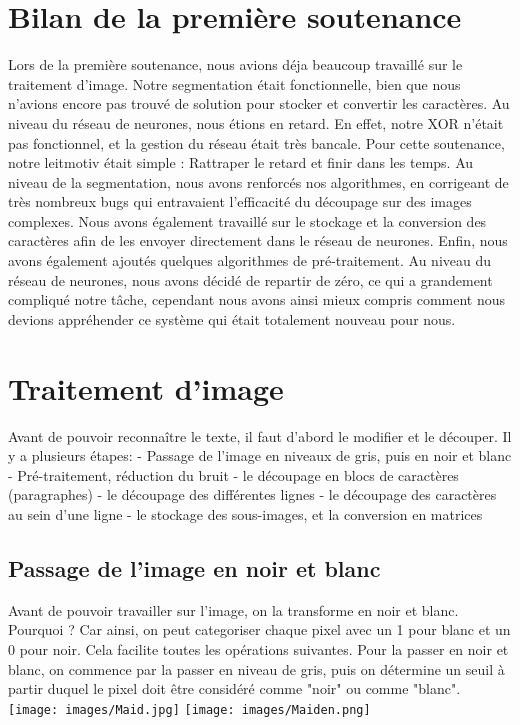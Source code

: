 \documentclass[14pt]{article}
\begin{document}
\section{Bilan de la première soutenance}
\indent
Lors de la première soutenance, nous avions déja beaucoup travaillé sur le traitement d'image. Notre segmentation était fonctionnelle, bien que nous n'avions encore pas trouvé de solution pour stocker et convertir les caractères. Au niveau du réseau de neurones, nous étions en retard. En effet, notre XOR n'était pas fonctionnel, et la gestion du réseau était très bancale. 
\newline
\newline
Pour cette soutenance, notre leitmotiv était simple : Rattraper le retard et finir dans les temps. Au niveau de la segmentation, nous avons renforcés nos algorithmes, en corrigeant de très nombreux bugs qui entravaient l'efficacité du découpage sur des images complexes. Nous avons également travaillé sur le stockage et la conversion des caractères afin de les envoyer directement dans le réseau de neurones. Enfin, nous avons également ajoutés quelques algorithmes de pré-traitement. Au niveau du réseau de neurones, nous avons décidé de repartir de zéro, ce qui a grandement compliqué notre tâche, cependant nous avons ainsi mieux compris comment nous devions appréhender ce système qui était totalement nouveau pour nous. 
\newpage
\section{Traitement d'image}
Avant de pouvoir reconnaître le texte, il faut d'abord le modifier et le découper. Il y a plusieurs étapes:
\newline
\indent - Passage de l'image en niveaux de gris, puis en noir et blanc
\newline
\indent - Pré-traitement, réduction du bruit
\newline
\indent - le découpage en blocs de caractères (paragraphes)
\newline
\indent - le découpage des différentes lignes
\newline
\indent - le découpage des caractères au sein d'une ligne
\newline
\indent - le stockage des sous-images, et la conversion en matrices
\subsection{Passage de l'image en noir et blanc}
Avant de pouvoir travailler sur l'image, on la transforme en noir et blanc. Pourquoi ? Car ainsi, on peut categoriser chaque pixel avec un 1 pour blanc et un 0 pour noir. Cela facilite toutes les op\'erations suivantes. Pour la passer en noir et blanc, on commence par la passer en niveau de gris, puis on détermine un seuil à partir duquel le pixel doit être considéré comme "noir" ou comme "blanc".
\newpage
\noindent
\texttt{[image: images/Maid.jpg]}
\texttt{[image: images/Maiden.png]}
\end{document}
